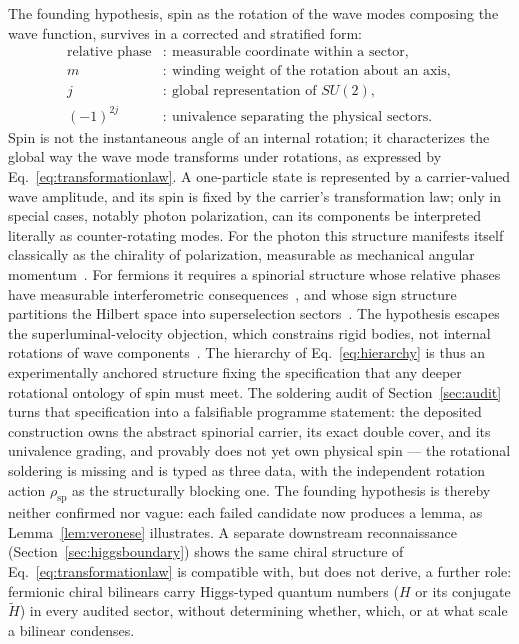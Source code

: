 \documentclass[11pt,a4paper]{article}
\begin{document}
The founding hypothesis, spin as the rotation of the wave modes composing the wave function, survives in a
corrected and stratified form:
\begin{equation}
\boxed{
\begin{aligned}
\text{relative phase} &: \ \text{measurable coordinate within a sector},\\
m &: \ \text{winding weight of the rotation about an axis},\\
j &: \ \text{global representation of } SU(2),\\
(-1)^{2j} &: \ \text{univalence separating the physical sectors}.
\end{aligned}}
\label{eq:hierarchy}
\end{equation}
Spin is not the instantaneous angle of an internal rotation; it characterizes the global way the wave mode
transforms under rotations, as expressed by Eq.~\eqref{eq:transformationlaw}.
A one-particle state is represented by a carrier-valued wave amplitude, and its spin is fixed by the
carrier's transformation law; only in special cases, notably photon polarization, can its components be
interpreted literally as counter-rotating modes.
For the photon this structure manifests itself classically as the chirality of polarization, measurable as
mechanical angular momentum~\cite{Beth1936}.
For fermions it requires a spinorial structure whose relative phases have measurable interferometric
consequences~\cite{Rauch1975, Werner1975}, and whose sign structure partitions the Hilbert space into
superselection sectors~\cite{Wick1952}.
The hypothesis escapes the superluminal-velocity objection, which constrains rigid bodies, not internal
rotations of wave components~\cite{Ohanian1986}.
The hierarchy of Eq.~\eqref{eq:hierarchy} is thus an experimentally anchored structure fixing the
specification that any deeper rotational ontology of spin must meet.
The soldering audit of Section~\ref{sec:audit} turns that specification into a falsifiable programme
statement: the deposited construction owns the abstract spinorial carrier, its exact double cover, and
its univalence grading, and provably does not yet own physical spin — the rotational soldering is
missing and is typed as three data, with the independent rotation action $\rho_{\mathrm{sp}}$ as the
structurally blocking one.
The founding hypothesis is thereby neither confirmed nor vague: each failed candidate now produces a
lemma, as Lemma~\ref{lem:veronese} illustrates.
A separate downstream reconnaissance (Section~\ref{sec:higgsboundary}) shows the same chiral structure
of Eq.~\eqref{eq:transformationlaw} is compatible with, but does not derive, a further role: fermionic
chiral bilinears carry Higgs-typed quantum numbers ($H$ or its conjugate $\widetilde{H}$) in every
audited sector, without determining whether, which, or at what scale a bilinear condenses.
\end{document}

